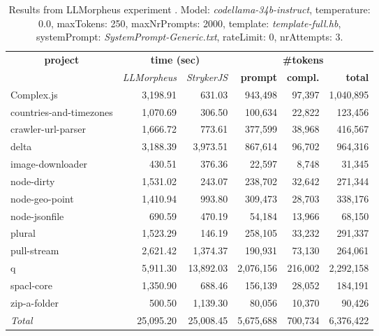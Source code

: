 
\begin{table*}[hbt!]
\centering
{\scriptsize
\begin{tabular}{l||r|r|r|r|r}
\multicolumn{1}{c|}{\bf project} & \multicolumn{2}{|c|}{\bf time (sec)} & \multicolumn{3}{|c|}{\bf \#tokens} \\
               & {\it LLMorpheus} & {\it StrykerJS} & {\bf prompt} & {\bf compl.} & {\bf total} \\
\hline
  Complex.js & 3,198.91 & 631.03 & 943,498 & 97,397 & 1,040,895 \\ 
countries-and-timezones & 1,070.69 & 306.50 & 100,634 & 22,822 & 123,456 \\ 
crawler-url-parser & 1,666.72 & 773.61 & 377,599 & 38,968 & 416,567 \\ 
delta & 3,188.39 & 3,973.51 & 867,614 & 96,702 & 964,316 \\ 
image-downloader & 430.51 & 376.36 & 22,597 & 8,748 & 31,345 \\ 
node-dirty & 1,531.02 & 243.07 & 238,702 & 32,642 & 271,344 \\ 
node-geo-point & 1,410.94 & 993.80 & 309,473 & 28,703 & 338,176 \\ 
node-jsonfile & 690.59 & 470.19 & 54,184 & 13,966 & 68,150 \\ 
plural & 1,523.29 & 146.19 & 258,105 & 33,232 & 291,337 \\ 
pull-stream & 2,621.42 & 1,374.37 & 190,931 & 73,130 & 264,061 \\ 
q & 5,911.30 & 13,892.03 & 2,076,156 & 216,002 & 2,292,158 \\ 
spacl-core & 1,350.90 & 688.46 & 156,139 & 28,052 & 184,191 \\ 
zip-a-folder & 500.50 & 1,139.30 & 80,056 & 10,370 & 90,426 \\ 
\hline
  \textit{Total} & 25,095.20 & 25,008.45 & 5,675,688 & 700,734 & 6,376,422 \\
  \end{tabular}
  }
  \\[2mm]
  \caption{Results from LLMorpheus experiment .
    Model: \textit{codellama-34b-instruct}, 
    temperature: 0.0, 
    maxTokens: 250, 
    maxNrPrompts: 2000, 
    template: \textit{template-full.hb}, 
    systemPrompt: \textit{SystemPrompt-Generic.txt}, 
    rateLimit: 0, 
    nrAttempts: 3.  
  }
  \label{table:Cost:run384:codellama-34b-instruct:template-full.hb:0.0}
\end{table*}